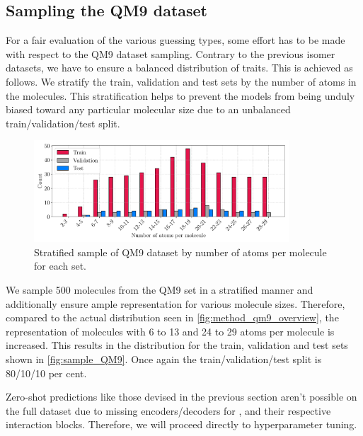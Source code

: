 \subsection{Sampling the QM9 dataset}
\label{sec:qm9_full_isomers_sampling}
For a fair evaluation of the various guessing types, some effort has to be made with respect to the QM9 dataset sampling. Contrary to the previous isomer datasets, we have to ensure a balanced distribution of traits. This is achieved as follows. We stratify the train, validation and test sets by the number of atoms in the molecules. This stratification helps to prevent the models from being unduly biased toward any particular molecular size due to an unbalanced train/validation/test split.
\begin{figure}[H]
    \centering
    \includegraphics[width=0.85\textwidth]{../fig/application/strat_sample.pdf}
    \caption[Stratified sample of QM9 dataset]{Stratified sample of QM9 dataset by number of atoms per molecule for each set.}
    \label{fig:sample_QM9}
\end{figure}
We sample 500 molecules from the QM9 set in a stratified manner and additionally ensure ample representation for various molecule sizes. Therefore, compared to the actual distribution seen in \autoref{fig:method_qm9_overview}, the representation of molecules with 6 to 13 and 24 to 29 atoms per molecule is increased. This results in the distribution for the train, validation and test sets shown in \autoref{fig:sample_QM9}. Once again the train/validation/test split is 80/10/10 per cent. %

Zero-shot predictions like those devised in the previous section aren't possible on the full dataset due to missing encoders/decoders for ,  and their respective interaction blocks. Therefore, we will proceed directly to hyperparameter tuning. 
